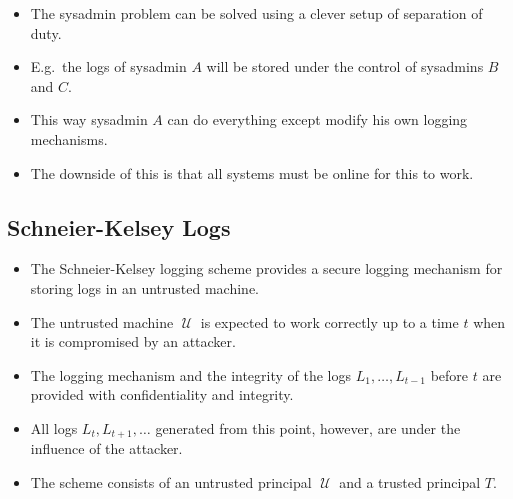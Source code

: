 \documentclass{beamer}
\DeclareMathOperator{\U}{\mathcal{U}}
\begin{document}
\begin{frame}{\insertsubsectionhead}
  \begin{itemize}
    \item The sysadmin problem can be solved using a clever setup of separation 
      of duty.

    \item E.g.\ the logs of sysadmin \(A\) will be stored under the control of 
      sysadmins \(B\) and \(C\).

    \item This way sysadmin \(A\) can do everything except modify his own 
      logging mechanisms.

    \item The downside of this is that all systems must be online for this to 
      work.

  \end{itemize}
\end{frame}

\subsection{Schneier-Kelsey Logs}

\begin{frame}{\insertsubsectionhead}
  \begin{itemize}
    \item The Schneier-Kelsey logging scheme provides a secure logging 
      mechanism for storing logs in an untrusted machine.

    \item The untrusted machine \(\U\) is expected to work correctly up to 
      a time \(t\) when it is compromised by an attacker.

    \item The logging mechanism and the integrity of the logs \(L_1, \ldots, 
      L_{t-1}\) before \(t\) are provided with confidentiality and integrity.

    \item All logs \(L_t, L_{t+1}, \ldots\) generated from this point, however, 
      are under the influence of the attacker.

  \end{itemize}
\end{frame}

\begin{frame}{\insertsubsectionhead}
  \begin{itemize}
    \item The scheme consists of an untrusted principal \(\U\) and a trusted 
      principal \(T\).

  \end{itemize}
\end{frame}
\end{document}
